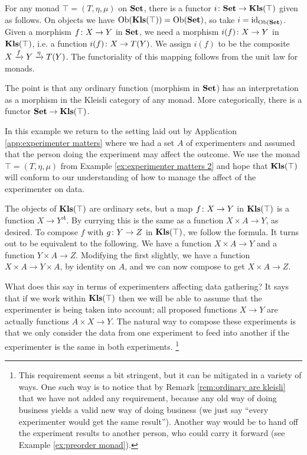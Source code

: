 \documentclass[CT4S-EN-RU]{subfiles}
\begin{document}
\begin{exampleRUS}
\end{exampleRUS}

\begin{remarkENG}\label{rem:ordinary are kleisli}
For any monad $\top=(T,\eta,\mu)$ on ${\mathbf{Set}}$, there is a functor $i\colon {\mathbf{Set}}\rightarrow{\mathbf{Kls}}(\top)$ given as follows. On objects we have $\textnormal{Ob}({\mathbf{Kls}}(\top))=\textnormal{Ob}({\mathbf{Set}})$, so take $i=\textnormal{id}_{\textnormal{Ob}({\mathbf{Set}})}$. Given a morphism $f\colon X\rightarrow Y$ in ${\mathbf{Set}}$, we need a morphism $i(f)\colon X\rightarrow Y$ in ${\mathbf{Kls}}(\top)$, i.e. a function $i(f)\colon X\rightarrow T(Y)$. We assign $i(f)$ to be the composite $X\xrightarrow{f}Y\xrightarrow{\eta}T(Y)$. The functoriality of this mapping follows from the unit law for monads.

The point is that any ordinary function (morphism in ${\mathbf{Set}}$) has an interpretation as a morphism in the Kleisli category of any monad. More categorically, there is a functor ${\mathbf{Set}}\rightarrow{\mathbf{Kls}}(\top)$.
\end{remarkENG}

\begin{remarkRUS}\label{rem:ordinary are kleisli}
\end{remarkRUS}

\begin{exampleENG}\label{ex:experimenter matters 3}
In this example we return to the setting laid out by Application \ref{app:experimenter matters} where we had a set $A$ of experimenters and assumed that the person doing the experiment may affect the outcome. We use the monad $\top=(T,\eta,\mu)$ from Example \ref{ex:experimenter matters 2} and hope that ${\mathbf{Kls}}(\top)$ will conform to our understanding of how to manage the affect of the experimenter on data.

The objects of ${\mathbf{Kls}}(\top)$ are ordinary sets, but a map $f\colon X\rightarrow Y$ in ${\mathbf{Kls}}(\top)$ is a function $X\to Y^A$. By currying this is the same as a function $X\times A\to Y$, as desired. To compose $f$ with $g\colon Y\rightarrow Z$ in ${\mathbf{Kls}}(\top)$, we follow the formula. It turns out to be equivalent to the following. We have a function $X\times A\to Y$ and a function $Y\times A\to Z$. Modifying the first slightly, we have a function $X\times A\to Y\times A$, by identity on $A$, and we can now compose to get $X\times A\to Z$.

What does this say in terms of experimenters affecting data gathering? It says that if we work within ${\mathbf{Kls}}(\top)$ then we will be able to assume that the experimenter is being taken into account; all proposed functions $X\to Y$ are actually functions $A\times X\to Y$. The natural way to compose these experiments is that we only consider the data from one experiment to feed into another if the experimenter is the same in both experiments.
\footnote{This requirement seems a bit stringent, but it can be mitigated in a variety of ways. One such way is to notice that by Remark \ref{rem:ordinary are kleisli} that we have not added any requirement, because any old way of doing business yields a valid new way of doing business (we just say “every experimenter would get the same result”). Another way would be to hand off the experiment results to another person, who could carry it forward (see Example \ref{ex:preorder monad}).}
\end{exampleENG}
\end{document}
